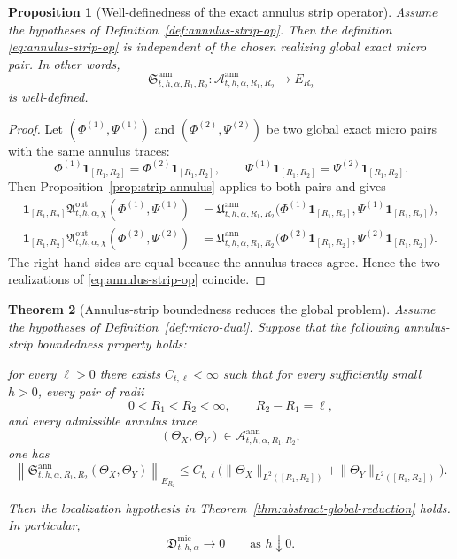 \documentclass[11pt,a4paper]{amsart}
\theoremstyle{plain}
\newtheorem{theorem}{Theorem}[section]
\newtheorem{proposition}[theorem]{Proposition}
\theoremstyle{definition}
\theoremstyle{remark}
\newcommand{\one}{\mathbf 1}
\begin{document}
\begin{proposition}[Well-definedness of the exact annulus strip operator]
\label{prop:annulus-strip-op}
Assume the hypotheses of Definition~\ref{def:annulus-strip-op}. Then the definition
\eqref{eq:annulus-strip-op} is independent of the chosen realizing global exact micro pair. In
other words,
\[
\mathfrak S_{t,h,\alpha,R_1,R_2}^{\mathrm{ann}}
:
\mathcal A_{t,h,\alpha,R_1,R_2}^{\mathrm{ann}}
\to
E_{R_2}
\]
is well-defined.
\end{proposition}

\begin{proof}
Let \((\Phi^{(1)},\Psi^{(1)})\) and \((\Phi^{(2)},\Psi^{(2)})\) be two global exact micro pairs
with the same annulus traces:
\[
\Phi^{(1)}\one_{[R_1,R_2]}=\Phi^{(2)}\one_{[R_1,R_2]},
\qquad
\Psi^{(1)}\one_{[R_1,R_2]}=\Psi^{(2)}\one_{[R_1,R_2]}.
\]
Then Proposition~\ref{prop:strip-annulus} applies to both pairs and gives
\begin{align*}
\one_{[R_1,R_2]}
\mathfrak A_{t,h,\alpha,\chi}^{\mathrm{out}}(\Phi^{(1)},\Psi^{(1)})
&=
\mathfrak U_{t,h,\alpha,R_1,R_2}^{\mathrm{ann}}
\bigl(
\Phi^{(1)}\one_{[R_1,R_2]},
\Psi^{(1)}\one_{[R_1,R_2]}
\bigr),\\
\one_{[R_1,R_2]}
\mathfrak A_{t,h,\alpha,\chi}^{\mathrm{out}}(\Phi^{(2)},\Psi^{(2)})
&=
\mathfrak U_{t,h,\alpha,R_1,R_2}^{\mathrm{ann}}
\bigl(
\Phi^{(2)}\one_{[R_1,R_2]},
\Psi^{(2)}\one_{[R_1,R_2]}
\bigr).
\end{align*}
The right-hand sides are equal because the annulus traces agree. Hence the two realizations of
\eqref{eq:annulus-strip-op} coincide.
\end{proof}

\begin{theorem}[Annulus-strip boundedness reduces the global problem]
\label{thm:annulus-strip-reduction}
Assume the hypotheses of Definition~\ref{def:micro-dual}. Suppose that the following annulus-strip
boundedness property holds:

\smallskip
\noindent
for every \(\ell>0\) there exists \(C_{t,\ell}<\infty\) such that for every sufficiently small
\(h>0\), every pair of radii
\[
0<R_1<R_2<\infty,
\qquad
R_2-R_1=\ell,
\]
and every admissible annulus trace
\[
(\Theta_X,\Theta_Y)\in \mathcal A_{t,h,\alpha,R_1,R_2}^{\mathrm{ann}},
\]
one has
\begin{equation}\label{eq:annulus-strip-bounded}
\left\|
\mathfrak S_{t,h,\alpha,R_1,R_2}^{\mathrm{ann}}(\Theta_X,\Theta_Y)
\right\|_{E_{R_2}}
\le
C_{t,\ell}
\bigl(
\|\Theta_X\|_{L^2([R_1,R_2])}
+
\|\Theta_Y\|_{L^2([R_1,R_2])}
\bigr).
\end{equation}

\smallskip
\noindent
Then the localization hypothesis in Theorem~\ref{thm:abstract-global-reduction} holds. In
particular,
\begin{equation}\label{eq:annulus-strip-global-collapse}
\mathfrak D_{t,h,\alpha}^{\mathrm{mic}}\longrightarrow0
\qquad\text{as }h\downarrow0.
\end{equation}
\end{theorem}
\end{document}
